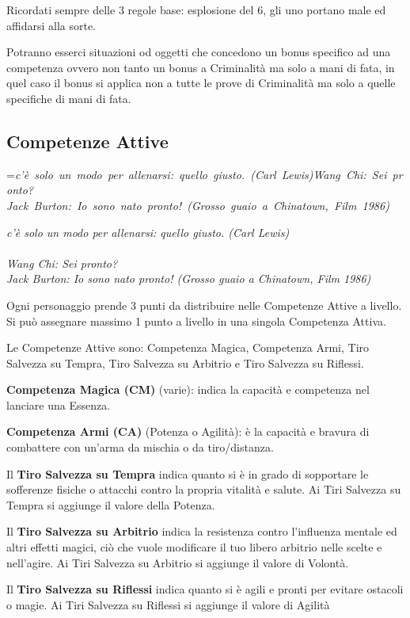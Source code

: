 \documentclass[a4paper,11pt,twoside,openany]{book}
\makeatletter
\newcommand{\mybox}[1]{%
	\setbox0=\hbox{#1}%
	\setlength{\@tempdima}{\dimexpr\wd0+13pt}%
	\begin{tcolorbox}[boxrule=0.5pt,arc=4pt, breakable,enhanced,
		left=6pt,right=6pt,top=6pt,bottom=6pt,boxsep=0pt,width=\@tempdima]
		#1
	\end{tcolorbox}
}
\makeatother
\begin{document}
Ricordati sempre delle 3 regole base: esplosione del 6, gli uno portano male ed affidarsi alla sorte.

\bigskip

Potranno esserci situazioni od oggetti che concedono un bonus specifico ad una competenza ovvero non tanto un bonus a Criminalità ma solo a mani di fata, in quel caso il bonus si applica non a tutte le prove di Criminalità ma solo a quelle specifiche di mani di fata.


\subsection{Competenze Attive}

\label{competenze-attive}
\mybox{\textit{c'è solo un modo per allenarsi: quello giusto. (Carl Lewis)\\\\
Wang Chi: Sei pronto?\\
Jack Burton: Io sono nato pronto! (Grosso guaio a Chinatown, Film 1986)
}}\medskip

Ogni personaggio prende 3 punti da distribuire nelle Competenze Attive a livello. Si può assegnare massimo 1 punto a livello in una singola Competenza Attiva.

Le Competenze Attive sono: Competenza Magica, Competenza Armi, Tiro Salvezza su Tempra, Tiro Salvezza su Arbitrio e Tiro Salvezza su Riflessi.

\textbf{Competenza Magica (CM)} (varie): indica la capacità e competenza nel lanciare una Essenza.

\textbf{Competenza Armi (CA)} (Potenza o Agilità): è la capacità e bravura di combattere con un'arma da mischia o da tiro/distanza.

Il \textbf{Tiro Salvezza su Tempra} indica quanto si è in grado di sopportare le sofferenze fisiche o attacchi contro la propria vitalità e salute. Ai Tiri Salvezza su Tempra si aggiunge il valore della Potenza. 

Il \textbf{Tiro Salvezza su Arbitrio} indica la resistenza contro l'influenza mentale ed altri effetti magici, ciò che vuole modificare il tuo libero arbitrio nelle scelte e nell'agire. Ai Tiri Salvezza su Arbitrio si aggiunge il valore di Volontà.

Il \textbf{Tiro Salvezza su Riflessi} indica quanto si è agili e pronti per evitare ostacoli o magie. Ai Tiri Salvezza su Riflessi si aggiunge il valore di Agilità
\end{document}
